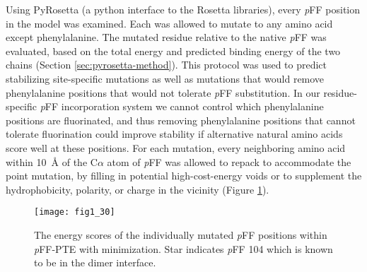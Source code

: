\begin{refsection}
Using PyRosetta (a python interface to the Rosetta
libraries)\cite{Leaver-Fay2011}, every \emph{p}FF position in the model was
examined. Each was allowed to mutate to any amino acid except phenylalanine.
The mutated residue relative to the native \emph{p}FF was evaluated, based on
the total energy and predicted binding energy of the two chains (Section
\ref{sec:pyrosetta-method}). This protocol was used to predict stabilizing
site-specific mutations as well as mutations that would remove phenylalanine
positions that would not tolerate \emph{p}FF substitution. In our
residue-specific \emph{p}FF incorporation system we cannot control which
phenylalanine positions are fluorinated, and thus removing phenylalanine
positions that cannot tolerate fluorination could improve stability if
alternative natural amino acids score well at these positions. For each
mutation, every neighboring amino acid within \SI{10}{\angstrom} of the C$\alpha$
atom of \emph{p}FF was allowed to repack to accommodate the point mutation, by
filling in potential high-cost-energy voids or to supplement the
hydrophobicity, polarity, or charge in the vicinity (Figure
\ref{fig:rosetta-pte-chart}).
\begin{figure}[htbp] \centering \texttt{[image: fig1\_30]}
    \caption[The energy scores of the individually mutated \emph{p}FF positions
        within \emph{p}FF-PTE with minimization. Star indicates pFF 104 which
        is known to be in the dimer interface.]{The energy scores of the
            individually mutated \emph{p}FF positions within \emph{p}FF-PTE
            with minimization. Star indicates \emph{p}FF 104 which is known to
        be in the dimer interface.}
    \label{fig:rosetta-pte-chart}
\end{figure}


\end{refsection}

